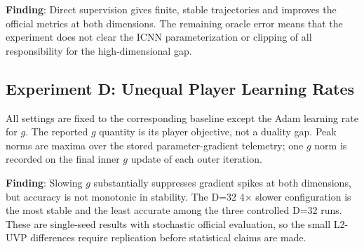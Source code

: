 \documentclass[11pt,a4paper]{article}
\begin{document}
\textbf{Finding}: Direct supervision gives finite, stable trajectories and improves the official metrics at both dimensions. The remaining oracle error means that the experiment does not clear the ICNN parameterization or clipping of all responsibility for the high-dimensional gap.

\subsection{Experiment D: Unequal Player Learning Rates}
All settings are fixed to the corresponding baseline except the Adam learning rate for $g$. The reported $g$ quantity is its player objective, not a duality gap. Peak norms are maxima over the stored parameter-gradient telemetry; one $g$ norm is recorded on the final inner $g$ update of each outer iteration.

\begin{table}[h]
\centering
\caption{Unequal player learning-rate experiment.}
\label{tab:unequal_lr}
\end{table}

\textbf{Finding}: Slowing $g$ substantially suppresses gradient spikes at both dimensions, but accuracy is not monotonic in stability. The D=32 4$\times$ slower configuration is the most stable and the least accurate among the three controlled D=32 runs. These are single-seed results with stochastic official evaluation, so the small L2-UVP differences require replication before statistical claims are made.
\end{document}
